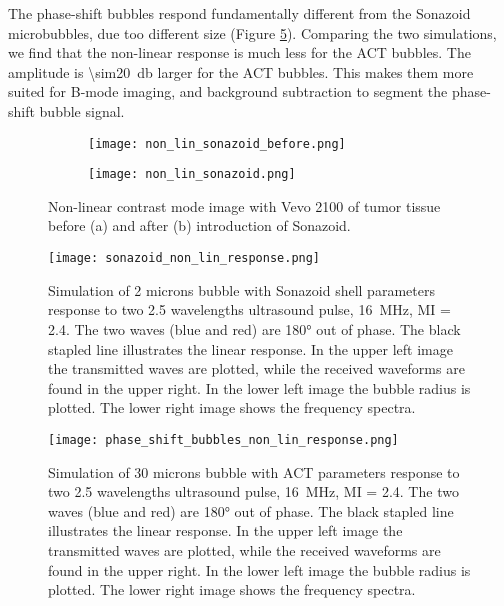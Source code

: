 The phase-shift bubbles respond fundamentally different from the Sonazoid\texttrademark{} microbubbles, due too different size (Figure \ref{Fig:PS_non_lin_response}). Comparing the two simulations, we find that the non-linear response is much less for the ACT\texttrademark{} bubbles. The amplitude is \SI{\sim20}{\decibel} larger for the ACT\texttrademark{} bubbles. This makes them more suited for B-mode imaging, and background subtraction to segment the phase-shift bubble signal.
\begin{figure}
	\centering
	\begin{subfigure}[b]{0.55\textwidth}
		\texttt{[image: non\_lin\_sonazoid\_before.png]}
		\caption{}
		\label{fig:Ng1} 
	\end{subfigure}
	
	\begin{subfigure}[b]{0.55\textwidth}
		\texttt{[image: non\_lin\_sonazoid.png]}
		\caption{}
		\label{fig:Ng2}
	\end{subfigure}
	\caption{Non-linear contrast mode image with Vevo 2100 of tumor tissue before (a) and after (b) introduction of Sonazoid\texttrademark{}.}
	\label{Fig:Sonazoid non-lin}
\end{figure}

\begin{figure}
	\texttt{[image: sonazoid\_non\_lin\_response.png]}
	\caption{Simulation of 2 microns bubble with Sonazoid\texttrademark{} shell parameters response to two \num{2.5} wavelengths ultrasound pulse,  \SI{16}{\mega\hertz}, MI = \num{2.4}. The two waves (blue and red) are \ang{180} out of phase. The black stapled line illustrates the linear response. In the upper left image the transmitted waves are plotted, while the received waveforms are found in the upper right. In the lower left image the bubble radius is plotted. The lower right image shows the frequency spectra.} 
	\label{Fig:sonazoid_non_lin_response}
\end{figure}
\begin{figure}
	\texttt{[image: phase\_shift\_bubbles\_non\_lin\_response.png]}
	\caption{Simulation of 30 microns bubble with ACT\texttrademark{} parameters response to two \num{2.5} wavelengths ultrasound pulse,  \SI{16}{\mega\hertz}, MI = \num{2.4}. The two waves (blue and red) are \ang{180} out of phase. The black stapled line illustrates the linear response. In the upper left image the transmitted waves are plotted, while the received waveforms are found in the upper right. In the lower left image the bubble radius is plotted. The lower right image shows the frequency spectra.} 
	\label{Fig:PS_non_lin_response}
\end{figure}

